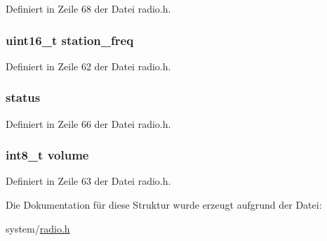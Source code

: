 Definiert in Zeile 68 der Datei radio.\+h.

\hypertarget{structradio_ae9e2de5c2a6d31fe02952daeb7d0f2cc}{}
\subsubsection[{station\+\_\+freq}]{\setlength{\rightskip}{0pt plus 5cm}uint16\+\_\+t station\+\_\+freq}\label{structradio_ae9e2de5c2a6d31fe02952daeb7d0f2cc}


Definiert in Zeile 62 der Datei radio.\+h.

\hypertarget{structradio_ac40df2ac7cfc276418e34335098903fb}{}
\subsubsection[{status}]{ {\bf status}}\label{structradio_ac40df2ac7cfc276418e34335098903fb}


Definiert in Zeile 66 der Datei radio.\+h.

\hypertarget{structradio_a0fe6eefa6e7f7329eb95938b5802289a}{}
\subsubsection[{volume}]{\setlength{\rightskip}{0pt plus 5cm}int8\+\_\+t volume}\label{structradio_a0fe6eefa6e7f7329eb95938b5802289a}


Definiert in Zeile 63 der Datei radio.\+h.



Die Dokumentation für diese Struktur wurde erzeugt aufgrund der Datei\+:\begin{DoxyCompactItemize}
\item 
system/\hyperlink{radio_8h}{radio.\+h}\end{DoxyCompactItemize}

